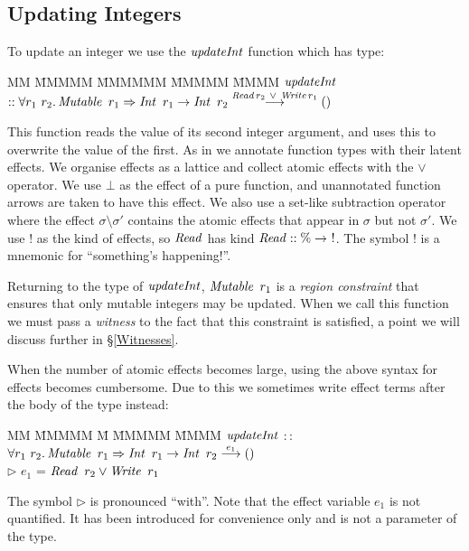 \subsection{Updating Integers}
\label{Update:UpdatingIntegers}

To update an integer we use the $\operatorname{\mathit{updateInt}}$ function which has type:
\begin{tabbing}
MM \= MMMMM \= MMMMMM \= MMMMM \= MMMM \kill
	\> $\operatorname{\mathit{updateInt}}$ \> $:: \forall r_1 \ r_2. 
				\operatorname{\mathit{Mutable}} \ r_1 
				\Rightarrow \operatorname{\mathit{Int}} \ r_1 \to \operatorname{\mathit{Int}} \ r_2 
				\stackrel{\operatorname{\mathit{Read}} r_2 \ \lor \ \operatorname{\mathit{Write}} r_1}{\longrightarrow} ()$
\end{tabbing}
This function reads the value of its second integer argument, and uses this to overwrite the value of the first. As in \cite{talpin:type-and-effect-discipline} we annotate function types with their latent effects. We organise effects as a lattice and collect atomic effects with the $\lor$ operator. We use $\bot$ as the effect of a pure function, and unannotated function arrows are taken to have this effect. We also use a set-like subtraction operator where the effect $\sigma \setminus \sigma'$ contains the atomic effects that appear in $\sigma$ but not $\sigma'$. We use $!$ as the kind of effects, so $\operatorname{\mathit{Read}}$ has kind $\operatorname{\mathit{Read}} :: \% \to \ !$. The symbol ! is a mnemonic for ``something's happening!''.

Returning to the type of $\operatorname{\mathit{updateInt}}$, $\operatorname{\mathit{Mutable}} \ r_1$ is a \emph{region constraint} that ensures that only mutable integers may be updated. When we call this function we must pass a \emph{witness} to the fact that this constraint is satisfied, a point we will discuss further in \S\ref{Witnesses}.

When the number of atomic effects becomes large, using the above syntax for effects becomes cumbersome. Due to this we sometimes write effect terms after the body of the type instead:
\begin{tabbing}
MM \= MMMMM \= M \= MMMMM \= MMMM \kill
	\> $\operatorname{\mathit{updateInt}}$ 
		\> $::$	 	\> $\forall r_1 \ r_2. \operatorname{\mathit{Mutable}} \ r_1 \Rightarrow \operatorname{\mathit{Int}} \ r_1 \to \operatorname{\mathit{Int}} \ r_2 \stackrel{e_1}{\longrightarrow} ()$ \\
	\>	\> $\rhd$	\> $e_1$ = $\operatorname{\mathit{Read}} \ r_2 \lor \operatorname{\mathit{Write}} \ r_1$
\end{tabbing}
The symbol $\rhd$ is pronounced ``with''. Note that the effect variable $e_1$ is not quantified. It has been introduced for convenience only and is not a parameter of the type. 


